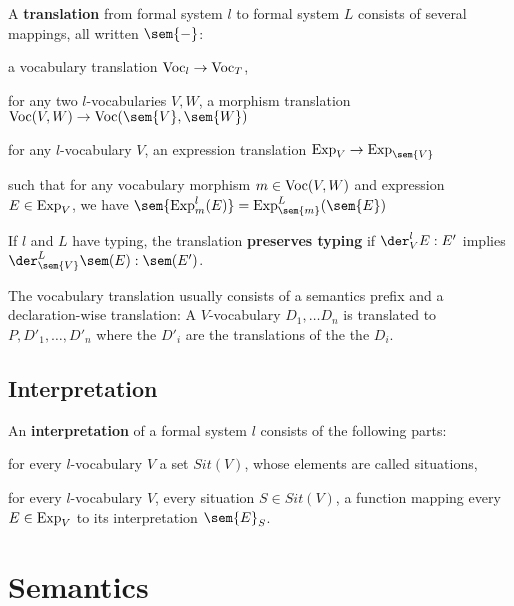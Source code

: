 \begin{definition}\label{def:css}
A \textbf{translation} from formal system $l$ to formal system $L$ consists of several mappings, all written $\sem{-}$:
\begin{compactitem}
 \item a vocabulary translation $\mathrm{Voc}_l\to \mathrm{Voc}_T$,
 \item for any two $l$-vocabularies $V,W$, a morphism translation $\VocM(V,W)\to \VocM(\sem{V},\sem{W})$
 \item for any $l$-vocabulary $V$, an expression translation $\Exp_V\to \Exp_{\sem{V}}$
 \item such that for any vocabulary morphism $m\in\mathrm{Voc}(V,W)$ and expression $E\in\mathrm{Exp}_V$, we have $\sem{\Exp^l_m(E)}=\Exp^L_{\sem{m}}(\sem{E})$
\end{compactitem}

If $l$ and $L$ have typing, the translation \textbf{preserves typing} if $\der^l_V E:E'$ implies $\der^L_{\sem{V}}\sem(E):\sem(E')$.
\end{definition}

The vocabulary translation usually consists of a semantics prefix and a declaration-wise translation: A $V$-vocabulary $D_1,\ldots D_n$ is translated to $P,D'_1,\ldots,D'_n$ where the $D'_i$ are the translations of the the $D_i$.

\subsection{Interpretation}

\begin{definition}
An \textbf{interpretation} of a formal system $l$ consists of the following parts:
\begin{compactitem}
 \item for every $l$-vocabulary $V$ a set $Sit(V)$, whose elements are called situations,
 \item for every $l$-vocabulary $V$, every situation $S\in Sit(V)$, a function mapping every $E\in \mathrm{Exp}_V$ to its interpretation $\sem{E}_S$.
\end{compactitem}
\end{definition}

\section{Semantics}

